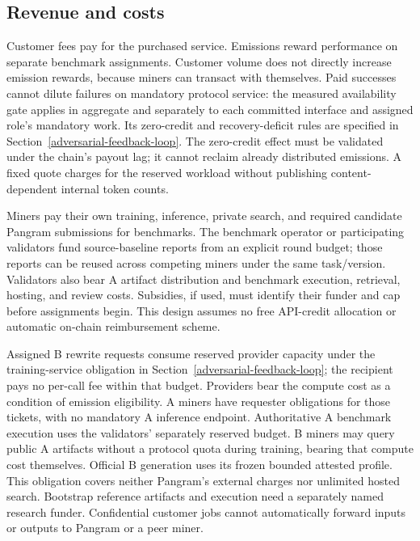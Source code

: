 \subsection{Revenue and costs}\label{revenue-and-costs}

Customer fees pay for the purchased service. Emissions reward
performance on separate benchmark assignments. Customer volume does not
directly increase emission rewards, because miners can transact with
themselves. Paid successes cannot dilute failures on mandatory protocol
service: the measured availability gate applies in aggregate and
separately to each committed interface and assigned role's mandatory work. Its zero-credit
and recovery-deficit rules are specified in Section~\ref{adversarial-feedback-loop}.
The zero-credit
effect must be validated under the chain's payout lag; it cannot reclaim
already distributed emissions. A fixed quote charges for the reserved workload without publishing
content-dependent internal token counts.

Miners pay their own training, inference, private search, and required
candidate Pangram submissions for benchmarks. The benchmark operator or
participating validators fund source-baseline reports from an explicit
round budget; those reports can be reused across competing miners under
the same task/version. Validators also bear A artifact distribution and
benchmark execution, retrieval, hosting, and review costs. Subsidies, if used, must identify their funder and cap
before assignments begin. This design assumes no free API-credit
allocation or automatic on-chain reimbursement scheme.

Assigned B rewrite requests consume reserved provider capacity under
the training-service obligation in
Section~\ref{adversarial-feedback-loop}; the recipient pays no per-call
fee within that budget. Providers bear the compute cost as a condition
of emission eligibility. A miners have requester obligations for those
tickets, with no mandatory A inference endpoint. Authoritative A
benchmark execution uses the validators' separately reserved budget.
B miners may query public A artifacts without a protocol quota during
training, bearing that compute cost themselves. Official B generation
uses its frozen bounded attested profile. This obligation covers neither
Pangram's external charges nor unlimited hosted search. Bootstrap
reference artifacts and execution need a separately named research
funder. Confidential customer
jobs cannot automatically forward inputs or outputs to Pangram or a
peer miner.
